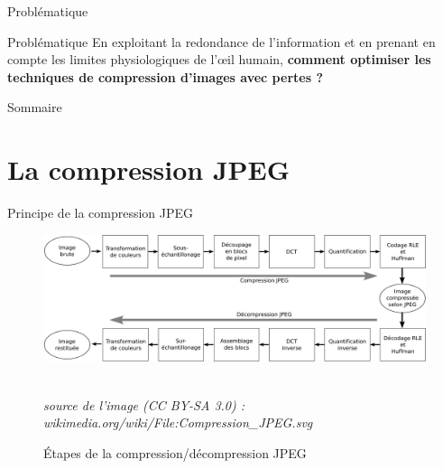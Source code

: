 \documentclass[xcolor=dvipsnames]{beamer}
\begin{document}
\begin{frame}{Problématique}
    \begin{block}{Problématique}
        En exploitant la redondance de l’information et en prenant en compte les limites physiologiques de l’œil humain, \textbf{comment optimiser les techniques de compression d'images avec pertes ?}
    \end{block}
\end{frame}


\begin{frame}{Sommaire}
    \tableofcontents
\end{frame}

\section{La compression JPEG}

\begin{frame}{Principe de la compression JPEG}
    \begin{figure}
        \centering
        \includegraphics[width=1\linewidth]{Compression_JPEG.png}
        \caption*{\centering Étapes de la compression/décompression JPEG}
        \textit{\tiny \\ source de l'image (CC BY-SA 3.0) : wikimedia.org/wiki/File:Compression\_JPEG.svg}
    \end{figure}
\end{frame}
\end{document}
